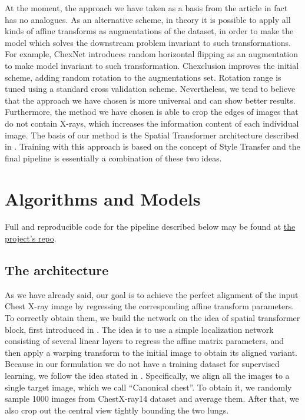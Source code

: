 \documentclass{article}
\begin{document}
At the moment, the approach we have taken as a basis from the article \cite{XRayDiagnosis}
 in fact has no analogues. As an alternative scheme, in theory it is 
 possible to apply all kinds of affine transforms as augmentations of the dataset, 
 in order to make the model which solves the downstream problem invariant to such 
 transformations. For example, ChexNet \cite{CheXNet} introduces random horizontal flipping 
 as an augmentation to make model invariant to such transformation.
 Chexclusion \cite{CheXclusion} improves the initial scheme, adding random rotation to the augmentations
 set. Rotation range is tuned using a standard cross validation scheme.
 Nevertheless, we tend to believe that the approach we have chosen 
 is more universal and can show better results. Furthermore, the method we have 
 chosen is able to crop the edges of images that do not contain X-rays, which 
 increases the information content of each individual image. The basis of our 
 method is the Spatial Transformer architecture described in \cite{SpatialTransform}. 
 Training with this approach is based on the concept of Style Transfer \cite{StyleTransfer} and 
 the final pipeline is essentially a combination of these two ideas.

\section{Algorithms and Models}\label{algorithms_and_models}
Full and reproducible code for the pipeline described below may be 
found at \href{https://github.com/bizzare-hub/Chest-Xray-alignment-using-STN.git}{the project's repo}.

\subsection{The architecture}

As we have already said, our goal is to achieve the perfect alignment of the input 
 Chest X-ray image by regressing the corresponding affine transform parameters. To 
 correctly obtain them, we build the network on the idea of spatial transformer 
 block, first introduced in \cite{SpatialTransform}. The idea is to use a simple 
 localization network consisting of several linear layers to regress the affine 
 matrix parameters, and then apply a warping transform to the initial image to 
 obtain its aligned variant.
Because in our formulation we do not have a training dataset for supervised 
 learning, we follow the idea stated in \cite{XRayDiagnosis}. Specifically, we 
 align all the images to a single target image, which we call ``Canonical chest''. 
 To obtain it, we randomly sample 1000 images from ChestX-ray14 dataset and 
 average them. After that, we also crop out the central view tightly bounding the 
 two lungs.
\end{document}
